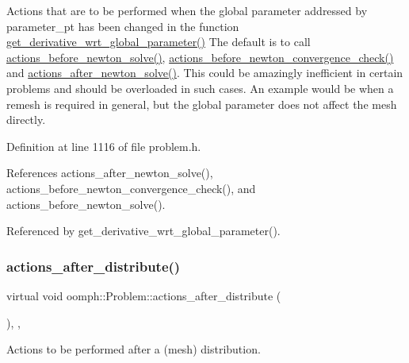 Actions that are to be performed when the global parameter addressed by parameter\+\_\+pt has been changed in the function \hyperlink{classoomph_1_1Problem_af4d959a47ef6a8d50b394a6761dfab5a}{get\+\_\+derivative\+\_\+wrt\+\_\+global\+\_\+parameter()} The default is to call \hyperlink{classoomph_1_1Problem_a0c8d70891f7369bb4bf8412fa1a08ecb}{actions\+\_\+before\+\_\+newton\+\_\+solve()}, \hyperlink{classoomph_1_1Problem_ae6ad96ddf5d48b517b89c9a9b879bc4b}{actions\+\_\+before\+\_\+newton\+\_\+convergence\+\_\+check()} and \hyperlink{classoomph_1_1Problem_a033ec7301123deeb7e56d04c38f9f1da}{actions\+\_\+after\+\_\+newton\+\_\+solve()}. This could be amazingly inefficient in certain problems and should be overloaded in such cases. An example would be when a remesh is required in general, but the global parameter does not affect the mesh directly. 



Definition at line 1116 of file problem.\+h.



References actions\+\_\+after\+\_\+newton\+\_\+solve(), actions\+\_\+before\+\_\+newton\+\_\+convergence\+\_\+check(), and actions\+\_\+before\+\_\+newton\+\_\+solve().



Referenced by get\+\_\+derivative\+\_\+wrt\+\_\+global\+\_\+parameter().

\mbox{\label{classoomph_1_1Problem_a4d3e3bd312518ca5afef94e169f81c39}} 
\subsubsection{\texorpdfstring{actions\+\_\+after\+\_\+distribute()}{actions\_after\_distribute()}}
{\footnotesize\ttfamily virtual void oomph\+::\+Problem\+::actions\+\_\+after\+\_\+distribute (\begin{DoxyParamCaption}{ }\end{DoxyParamCaption})\hspace{0.3cm}{\ttfamily [inline]}, {\ttfamily [protected]}, {\ttfamily [virtual]}}



Actions to be performed after a (mesh) distribution. 



